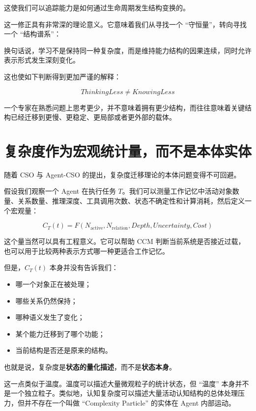 这使我们可以追踪能力是如何通过生命周期发生结构变换的。

这一修正具有非常深的理论意义。它意味着我们从寻找一个 ``守恒量''，转向寻找一个 ``结构谱系''：

\begin{statementbox}
\centering
{}
\end{statementbox}

换句话说，学习不是保持同一种复杂度，而是维持能力结构的因果连续，同时允许表示形式发生深刻变化。

这也使如下判断得到更加严谨的解释：

\[
\boxed{
ThinkingLess\neq KnowingLess
}
\]

一个专家在熟悉问题上思考更少，并不意味着拥有更少结构，而往往意味着关键结构已经迁移到更慢、更稳定、更局部或者更外部的载体。

\section{复杂度作为宏观统计量，而不是本体实体}
\label{sec:complexity-not-ontology}

随着 CSO 与 Agent-CSO 的提出，复杂度迁移理论的本体问题变得不可回避。

假设我们观察一个 Agent 在执行任务 $T$。我们可以测量工作记忆中活动对象数量、关系数量、推理深度、工具调用次数、状态不确定性和计算消耗，然后定义一个宏观量：

\[
C_T(t)
=
F(
N_{\mathrm{active}},
N_{\mathrm{relation}},
Depth,
Uncertainty,
Cost
)
\]

这个量当然可以具有工程意义。它可以帮助 CCM 判断当前系统是否接近过载，也可以用于比较两种表示方式哪一种更适合工作记忆。

但是，$C_T(t)$ 本身并没有告诉我们：

\begin{itemize}
    \item 哪一个对象正在被处理；
    \item 哪些关系仍然保持；
    \item 哪种语义发生了变化；
    \item 某个能力迁移到了哪个功能；
    \item 当前结构是否还是原来的结构。
\end{itemize}

也就是说，复杂度是\textbf{状态的量化描述}，而不是\textbf{状态本身}。

这一点类似于温度。温度可以描述大量微观粒子的统计状态，但 ``温度'' 本身并不是一个独立粒子。类似地，认知复杂度可以描述大量活动认知结构的总体处理压力，但并不存在一个叫做 ``Complexity Particle'' 的实体在 Agent 内部运动。

